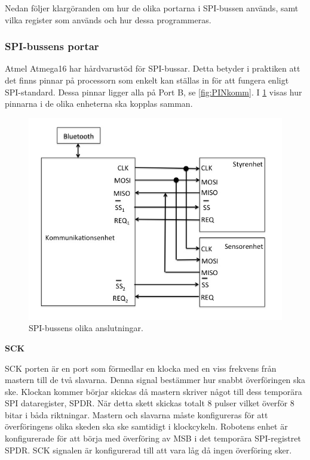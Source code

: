 Nedan följer klargöranden om hur de olika portarna i SPI-bussen används, samt 
vilka register som används och hur dessa programmeras. 

\subsubsection{SPI-bussens portar}

Atmel Atmega16 har hårdvarustöd för SPI-bussar. Detta betyder i praktiken att 
det finns pinnar på processorn som enkelt kan ställas in för att fungera 
enligt SPI-standard. Dessa pinnar ligger alla på Port B, se \ref{fig:PINkomm}.
I \ref{fig:spibuss} visas hur pinnarna i de olika enheterna ska kopplas samman.

\begin{figure}[H]
  \centering
 \includegraphics[angle=0,scale=0.5]{bilder/SPI-buss.png}
  \caption{SPI-bussens olika anslutningar. }
  \label{fig:spibuss}
\end{figure}


\textbf{SCK}


SCK porten är en port som förmedlar en klocka med en viss frekvens från 
mastern till de två slavarna. Denna signal bestämmer hur snabbt överföringen 
ska ske. Klockan kommer börjar skickas då mastern skriver något till dess 
temporära SPI dataregister, SPDR. När detta skett skickas totalt 8 pulser 
vilket överför 8 bitar i båda riktningar. Mastern och slavarna måste 
konfigureras för att överföringens olika skeden ska ske samtidigt i 
klockcykeln. Robotens enhet är konfigurerade för att börja med överföring av 
MSB i det temporära SPI-registret SPDR. SCK signalen är konfigurerad till att 
vara låg då ingen överföring sker.

